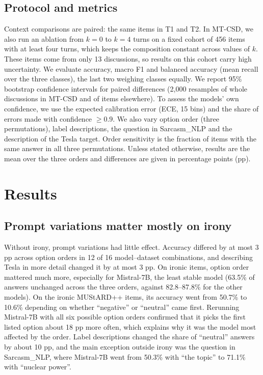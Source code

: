 \documentclass[12pt]{article}
\begin{document}
\subsection{Protocol and metrics}
Context comparisons are paired: the same items in T1 and T2. In MT-CSD, we also run an ablation from \(k=0\) to \(k=4\) turns on a fixed cohort of 456 items with at least four turns, which keeps the composition constant across values of \(k\). These items come from only 13 discussions, so results on this cohort carry high uncertainty. We evaluate accuracy, macro F1 and balanced accuracy (mean recall over the three classes), the last two weighing classes equally. We report 95\% bootstrap confidence intervals for paired differences (2,000 resamples of whole discussions in MT-CSD and of items elsewhere). To assess the models' own confidence, we use the expected calibration error (ECE, 15 bins) and the share of errors made with confidence \(\geq 0.9\). We also vary option order (three permutations), label descriptions, the question in Sarcasm\_NLP and the description of the Tesla target. Order sensitivity is the fraction of items with the same answer in all three permutations. Unless stated otherwise, results are the mean over the three orders and differences are given in percentage points (pp).
\section{Results}
\label{sec:org92de641}

\subsection{Prompt variations matter mostly on irony}
Without irony, prompt variations had little effect. Accuracy differed by at most 3 pp across option orders in 12 of 16 model--dataset combinations, and describing Tesla in more detail changed it by at most 3 pp. On ironic items, option order mattered much more, especially for Mistral-7B, the least stable model (63.5\% of answers unchanged across the three orders, against 82.8--87.8\% for the other models). On the ironic MUStARD++ items, its accuracy went from 50.7\% to 10.6\% depending on whether ``negative'' or ``neutral'' came first. Rerunning Mistral-7B with all six possible option orders confirmed that it picks the first listed option about 18 pp more often, which explains why it was the model most affected by the order. Label descriptions changed the share of ``neutral'' answers by about 10 pp, and the main exception outside irony was the question in Sarcasm\_NLP, where Mistral-7B went from 50.3\% with ``the topic'' to 71.1\% with ``nuclear power''.
\end{document}
